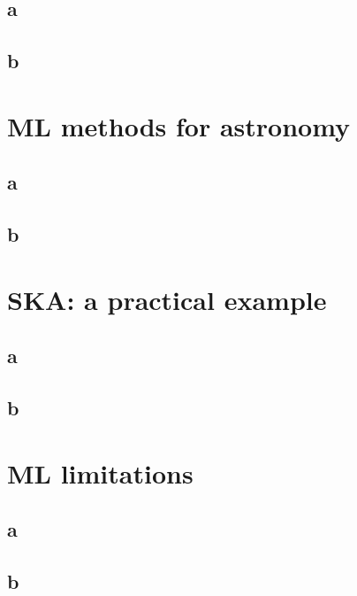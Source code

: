 \documentclass{beamer}
\begin{document}
\subsection{a}\frame{}
\subsection{b}\frame{}

\section{ML methods for astronomy}
\subsection{a}\frame{}
\subsection{b}\frame{}

\section{SKA: a practical example}
\subsection{a}\frame{}
\subsection{b}\frame{}
\section{ML limitations}
\subsection{a}\frame{}
\subsection{b}\frame{}
\end{document}
